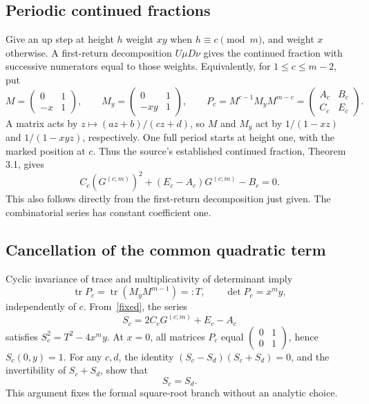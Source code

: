 \documentclass[11pt]{article}
\newcommand{\G}[1]{G^{(#1;m)}}
\begin{document}
\subsection*{Periodic continued fractions}
Give an up step at height $h$ weight $xy$ when $h\equiv c\pmod m$,
and weight $x$ otherwise. A first-return decomposition $U\mu D\nu$
gives the continued fraction with successive numerators equal to those
weights. Equivalently, for $1\leq c\leq m-2$, put
\[
 M=\begin{pmatrix}0&1\\-x&1\end{pmatrix},\qquad
 M_y=\begin{pmatrix}0&1\\-xy&1\end{pmatrix},\qquad
 P_c=M^{c-1}M_yM^{m-c}
     =\begin{pmatrix}A_c&B_c\\C_c&E_c\end{pmatrix}.
\]
A matrix acts by $z\mapsto(az+b)/(cz+d)$, so $M$ and $M_y$ act by
$1/(1-xz)$ and $1/(1-xyz)$, respectively. One full period starts at
height one, with the marked position at $c$. Thus the source's established
continued fraction, Theorem 3.1, gives
\begin{equation}\label{fixed}
 C_c(\G c)^2+(E_c-A_c)\G c-B_c=0.
\end{equation}
This also follows directly from the first-return decomposition just given.
The combinatorial series has constant coefficient one.

\subsection*{Cancellation of the common quadratic term}
Cyclic invariance of trace and multiplicativity of determinant imply
\[
 \operatorname{tr}P_c=\operatorname{tr}(M_yM^{m-1})=:T,
 \qquad \det P_c=x^m y,
\]
independently of $c$. From~\eqref{fixed}, the series
\[
 S_c=2C_c\G c+E_c-A_c
\]
satisfies $S_c^2=T^2-4x^m y$. At $x=0$, all matrices $P_c$ equal
$\left(\begin{smallmatrix}0&1\\0&1\end{smallmatrix}\right)$, hence
$S_c(0,y)=1$. For any $c,d$, the identity
$(S_c-S_d)(S_c+S_d)=0$, and the invertibility of $S_c+S_d$, show that
\begin{equation}\label{sameS}
 S_c=S_d.
\end{equation}
This argument fixes the formal square-root branch without an analytic choice.
\end{document}
